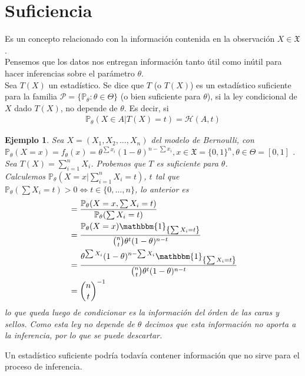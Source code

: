 \documentclass[10pt]{article}
\theoremstyle{plain}
\newtheorem{ej}{Ejemplo}
\theoremstyle{definition}
\begin{document}
\section{Suficiencia}
Es un concepto relacionado con la información contenida en la observación $X \in \mathfrak{X}$.\\
Pensemos que los datos nos entregan información tanto útil como inútil para hacer inferencias sobre el parámetro $\theta$.\\

Sea $T(X)$ un estadístico. Se dice que $T$ (o $T(X)$) es un estadístico suficiente para la familia $\mathcal{P}=\{\mathbb{P}_{\theta}\colon \theta \in \Theta\}$ (o bien suficiente para $\theta$), si la ley condicional de $X$ dado $T(X)$, no depende de $\theta$. Es decir, si
\begin{align*}
\mathbb{P}_{\theta}(X\in A | T(X) = t) = \mathcal{H}(A,t)
\end{align*}
\begin{ej}
Sea $X=(X_{1},X_{2},\ldots,X_{n})$ del modelo de Bernoulli, con $\mathbb{P}_{\theta}(X=x) = f_{\theta}(x) = \theta^{\sum{x_{i}}}(1-\theta)^{n-\sum{x_{i}}}, x \in \mathfrak{X} = \{0,1\}^n, \theta \in \Theta =\left[0,1\right]$ .\\
Sea $T(X) = \sum_{i=1}^n{X_{i}}$. Probemos que $T$ es suficiente para $\theta$.\\
Calculemos $\mathbb{P}_{\theta}(X=x| \sum_{i=1}^n{X_{i}}=t)$,  $t$ tal que $\mathbb{P}_{\theta}(\sum{X_{i}}=t)>0 \Leftrightarrow t \in \{0,\ldots,n\}$, lo anterior es 
\begin{align*}
&= \frac{\mathbb{P}_{\theta}(X=x, \sum{X_{i}}=t)}{\mathbb{P}_{\theta}(\sum{X_{i}}=t)}\\
&= \frac{\mathbb{P}_{\theta}(X=x)\mathbbm{1}_{\left\{\sum{X_{i}}=t\right\}}}{\binom{n}{t}\theta^{t}(1-\theta)^{n-t}}\\
&= \frac{\theta^{\sum{X_{i}}}(1-\theta)^{n-\sum{X_{i}}}\mathbbm{1}_{\left\{\sum{X_{i}}=t\right\}}}{\binom{n}{t}\theta^{t}(1-\theta)^{n-t}}\\
&= \binom{n}{t}^{-1}
\end{align*}
lo que queda luego de condicionar es la información del órden de las caras y sellos. Como esta ley no depende de $\theta$ decimos que esta información no aporta a la inferencia, por lo que se puede descartar.\\
\end{ej}
Un estadístico suficiente podría todavía contener información que no sirve para el proceso de inferencia.\\
\end{document}
